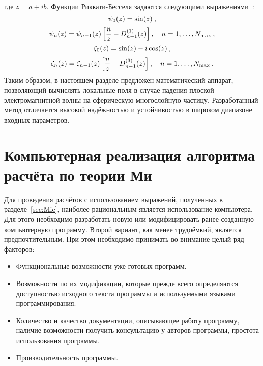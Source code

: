 где $z=a+ib$. Функции Риккати-Бесселя задаются следующими
выражениями~\cite{Wiscombe-1980,Mackowski-1990}:
\begin{equation*}
  \label{eq:pena20a}
  \psi_0(z) = {\rm sin}(z)\:,
\end{equation*}
\begin{equation*}
  \label{eq:pena20b}
\psi_n(z) = \psi_{n-1}(z)
\left[
\frac{n}{z}-D_{n-1}^{(1)}(z)
\right], \quad n=1,\ldots, N_{\rm max}\:,
\end{equation*}
\begin{equation*}
  \label{eq:pena21a}
\zeta_0(z) = {\rm sin}(z) - i\,{\rm cos}(z)\:,
\end{equation*}
\begin{equation*}
  \label{eq:pena21b}
\zeta_n(z) = \zeta_{n-1}(z)
\left[
\frac{n}{z}-D_{n-1}^{(3)}(z)
\right], \quad n=1,\ldots, N_{\rm max}\:.
\end{equation*}
Таким образом, в настоящем разделе предложен математический аппарат,
позволяющий вычислять локальные поля в случае падения плоской
электромагнитной волны на сферическую многослойную
частицу. Разработанный метод отличается высокой надёжностью и
устойчивостью в широком диапазоне входных параметров.


\section{Компьютерная реализация алгоритма расчёта по теории Ми}
\label{sec:code}


Для проведения расчётов с использованием выражений, полученных в
разделе~\ref{sec:Mie}, наиболее рациональным является использование
компьютера.  Для этого необходимо разработать новую или модифицировать
ранее созданную компьютерную программу. Второй вариант, как менее
трудоёмкий, является предпочтительным.  При этом необходимо принимать
во внимание целый ряд факторов:
\begin{itemize}
\item Функциональные возможности уже готовых программ.
\item Возможности по их модификации, которые прежде всего определяются
  доступностью исходного текста программы и используемыми языками программирования.
\item Количество и качество документации, описывающее работу
  программу, наличие возможности получить консультацию у авторов
  программы, простота использования программы.
\item Производительность программы.
\end{itemize}

